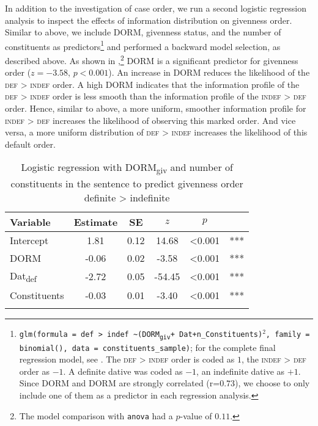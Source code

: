 \documentclass[output=paper,colorlinks,citecolor=brown]{langscibook}
\begin{document}
In addition to the investigation of case order, we run a second logistic regression analysis to inspect the effects of information distribution on givenness order. Similar to above, we include \textnormal{DORM}\xspace, givenness status, and the number of constituents as predictors\footnote{\texttt{glm(formula = def > indef \textasciitilde (\textnormal{DORM}\textsubscript{giv}\xspace + Dat+n\_Constituents)$^2$, family = binomial(), data = constituents\_sample)}; for the complete final regression model, see . The \textsc{def > indef} order is coded as $1$, the \textsc{indef > def} order as $-1$. A definite dative was coded as $-1$, an indefinite dative as $+1$. Since \textnormal{DORM} and \textnormal{DORM} are strongly correlated (r=$0.73$), we choose to only include one of them as a predictor in each regression analysis.} and performed a backward model selection, as described above.
As shown in ,\footnote{The model comparison with \texttt{anova} had a $p$-value of  $0.11$.} \textnormal{DORM}\xspace is a  significant predictor for givenness order ($z=-3.58$, $p<0.001$). An increase in \textnormal{DORM}\xspace reduces the likelihood of the \textsc{def > indef} order. A high \textnormal{DORM}\xspace indicates that the information profile of the \textsc{def > indef} order is less smooth than the information profile of the \textsc{indef > def} order. Hence, similar to above, a more uniform, smoother information profile for \textsc{indef > def} increases the likelihood of observing this marked order. And vice versa, a more uniform distribution of \textsc{def > indef} increases the likelihood of this default order.

\begin{table}
    \begin{tabular}{l S[table-format=-1.2] S[table-format=1.2] S[table-format=-2.2] S[table-format=<1.3] @{\,} l}
    \lsptoprule
       Variable   & {Estimate} & {SE} & {$z$} & {$p$} & \\\midrule
    Intercept &  1.81 &   0.12 & 14.68 & <0.001 & ***\\
    \textnormal{DORM}\xspace &  -0.06 &  0.02 &  -3.58 & <0.001 & ***\\
    Dat\textsubscript{def} & -2.72 &  0.05 & -54.45 & <0.001 & ***\\
    Constituents& -0.03 &   0.01&  -3.40 & <0.001 &*** \\
   \lspbottomrule
   \end{tabular}
   \caption{Logistic regression with \textnormal{DORM}\textsubscript{giv}\xspace and number of constituents in the sentence to predict givenness order definite > indefinite}
   \label{Regession.AV:def>indef}
\end{table}
\end{document}
